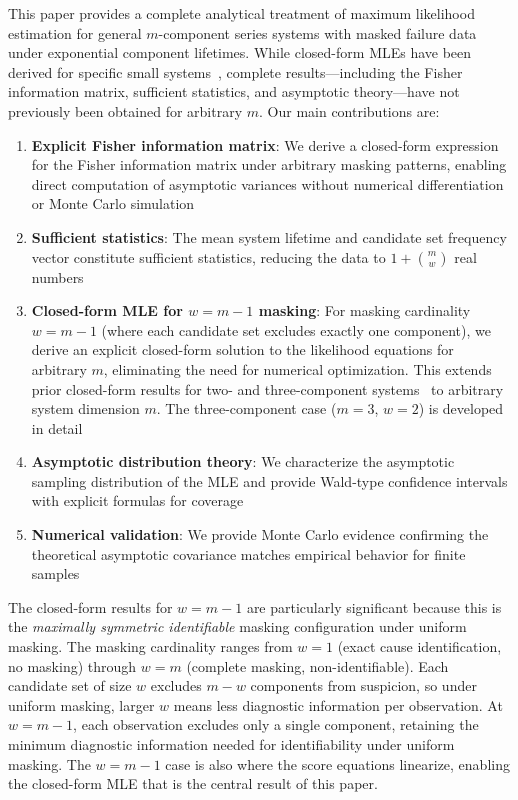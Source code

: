 \documentclass[pdflatex,sn-mathphys-num,Numbered]{sn-jnl}
\theoremstyle{thmstyleone}
\theoremstyle{thmstylethree}
\theoremstyle{thmstyletwo}
\begin{document}
This paper provides a complete analytical treatment of maximum likelihood estimation for general $m$-component series systems with masked failure data under exponential component lifetimes. While closed-form MLEs have been derived for specific small systems~\cite{miyakawa1984,exactmle}, complete results---including the Fisher information matrix, sufficient statistics, and asymptotic theory---have not previously been obtained for arbitrary $m$. Our main contributions are:
\begin{enumerate}
    \item \textbf{Explicit Fisher information matrix}: We derive a closed-form expression for the Fisher information matrix under arbitrary masking patterns, enabling direct computation of asymptotic variances without numerical differentiation or Monte Carlo simulation

    \item \textbf{Sufficient statistics}: The mean system lifetime and candidate set frequency vector constitute sufficient statistics, reducing the data to $1 + \binom{m}{w}$ real numbers

    \item \textbf{Closed-form MLE for $w=m-1$ masking}: For masking cardinality $w = m-1$ (where each candidate set excludes exactly one component), we derive an explicit closed-form solution to the likelihood equations for arbitrary $m$, eliminating the need for numerical optimization. This extends prior closed-form results for two- and three-component systems~\cite{miyakawa1984,exactmle} to arbitrary system dimension $m$. The three-component case ($m=3$, $w=2$) is developed in detail

    \item \textbf{Asymptotic distribution theory}: We characterize the asymptotic sampling distribution of the MLE and provide Wald-type confidence intervals with explicit formulas for coverage

    \item \textbf{Numerical validation}: We provide Monte Carlo evidence confirming the theoretical asymptotic covariance matches empirical behavior for finite samples
\end{enumerate}

The closed-form results for $w=m-1$ are particularly significant because this is the \emph{maximally symmetric identifiable} masking configuration under uniform masking. The masking cardinality ranges from $w=1$ (exact cause identification, no masking) through $w=m$ (complete masking, non-identifiable). Each candidate set of size $w$ excludes $m-w$ components from suspicion, so under uniform masking, larger $w$ means less diagnostic information per observation. At $w=m-1$, each observation excludes only a single component, retaining the minimum diagnostic information needed for identifiability under uniform masking. The $w=m-1$ case is also where the score equations linearize, enabling the closed-form MLE that is the central result of this paper.
\end{document}
